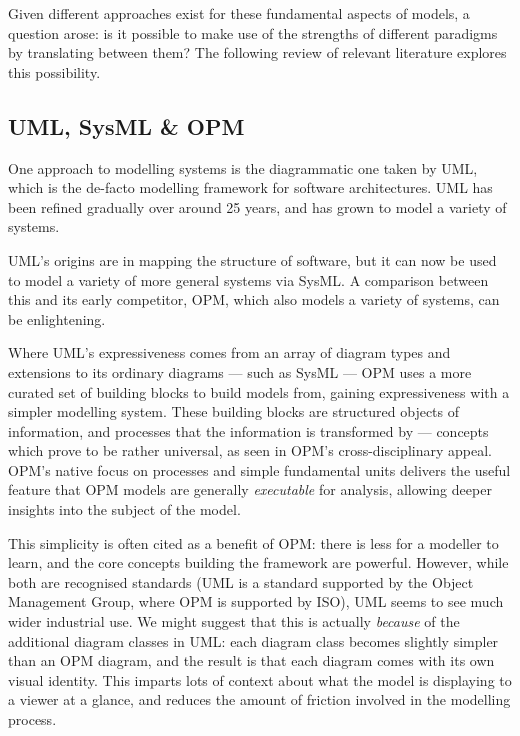 \documentclass{article}
\begin{document}
Given different approaches exist for these fundamental aspects of models, a
question arose: is it possible to make use of the strengths of different
paradigms by translating between them? The following review of relevant
literature explores this possibility.\par


\subsection{UML, SysML \& OPM}
\label{subsec:uml}
One approach to modelling systems is the diagrammatic one taken by
UML\cite{rumbaugh2017unified}, which is the de-facto modelling framework for
software architectures. UML has been refined gradually over around 25 years, and
has grown to model a variety of systems.

UML's origins are in mapping the structure of software, but it can now be used
to model a variety of more general systems via SysML\cite{sysml_spec}. A
comparison between this and its early competitor, OPM\cite{dori1995object},
which also models a variety of systems, can be enlightening.\par

Where UML's expressiveness comes from an array of diagram types and extensions
to its ordinary diagrams --- such as SysML --- OPM uses a more curated set of
building blocks to build models from, gaining expressiveness with a simpler
modelling system. These building blocks are structured objects of information,
and processes that the information is transformed by --- concepts which prove to
be rather universal, as seen in OPM's cross-disciplinary
appeal\cite{opm_bio_research}. OPM's native focus on processes and simple
fundamental units delivers the useful feature that OPM models are generally
\emph{executable} for analysis, allowing deeper insights into the subject of
the model.\par

This simplicity is often cited as a benefit of OPM: there is less for a modeller
to learn, and the core concepts building the framework are powerful. However,
while both are recognised standards (UML is a standard supported by the Object
Management Group, where OPM is supported by ISO), UML seems to see much wider
industrial use. We might suggest that this is actually \emph{because} of the
additional diagram classes in UML: each diagram class becomes slightly simpler
than an OPM diagram, and the result is that each diagram comes with its own
visual identity. This imparts lots of context about what the model is displaying
to a viewer at a glance, and reduces the amount of friction involved in the
modelling process.\par
\end{document}
